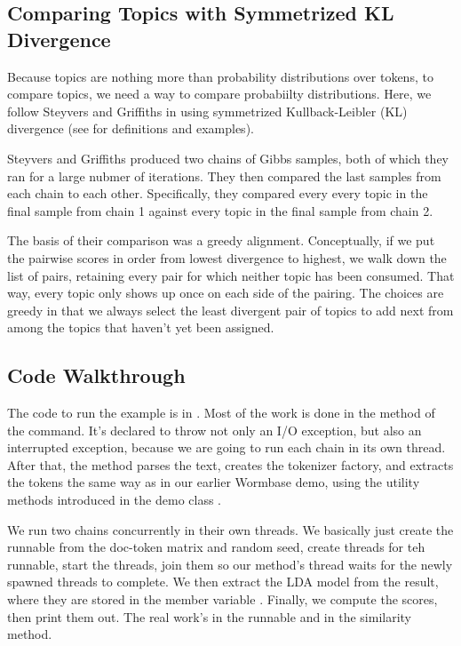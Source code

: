\subsection{Comparing Topics with Symmetrized KL Divergence}

Because topics are nothing more than probability distributions over
tokens, to compare topics, we need a way to compare probabiilty
distributions.  Here, we follow Steyvers and Griffiths in using
symmetrized Kullback-Leibler (KL) divergence (see
 for definitions and
examples).

Steyvers and Griffiths produced two chains of Gibbs samples, both of
which they ran for a large nubmer of iterations.  They then compared
the last samples from each chain to each other.  Specifically, they
compared every every topic in the final sample from chain 1 against
every topic in the final sample from chain 2.  

The basis of their comparison was a greedy alignment.  Conceptually,
if we put the pairwise scores in order from lowest divergence to
highest, we walk down the list of pairs, retaining every pair for
which neither topic has been consumed.  That way, every topic only
shows up once on each side of the pairing.  The choices are greedy in
that we always select the least divergent pair of topics to add next
from among the topics that haven't yet been assigned.


\subsection{Code Walkthrough}

The code to run the example is in .  Most of the
work is done in the  method of the command.  It's declared
to throw not only an I/O exception, but also an interrupted exception,
because we are going to run each chain in its own thread.  
%
%
After that, the method parses the text, creates the tokenizer factory,
and extracts the tokens the same way as in our earlier Wormbase demo,
using the utility methods introduced in the demo class .

We run two chains concurrently in their own threads.  We basically
just create the runnable from the doc-token matrix and random
seed, create threads for teh runnable, start the threads, join
them so our  method's thread waits for the newly spawned
threads to complete.  We then extract the LDA model from the result,
where they are stored in the member variable .  Finally,
we compute the scores, then print them out.
%
%
The real work's in the runnable and in the similarity method.

